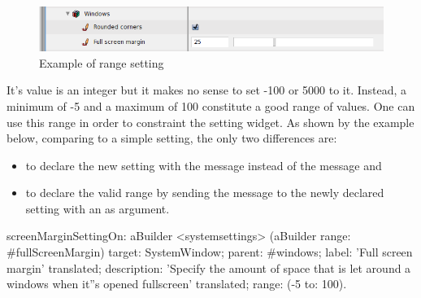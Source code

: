 \documentclass[a4paper,10pt,twoside]{book}
\begin{document}
\begin{figure}[tbh]
\begin{center}
\includegraphics[scale=0.38]{fullScreenMargin}
\caption{Example of range setting}
\end{center}
\end{figure}

It's value is an integer but it makes no sense to set -100 or 5000 to it. 
Instead, a minimum of -5 and a maximum of 100 constitute a good range of values. One can use this range in order to constraint the setting widget. As shown by the example below, comparing to a simple setting, the only two differences are:
\begin{itemize}
\item 
	to declare the new setting with the  message instead of the  message and
\item
	to declare the valid range by sending the  message to the newly declared setting with an  as argument.
\end{itemize}

\begin{code}{}
screenMarginSettingOn: aBuilder
	<systemsettings>
	(aBuilder range: #fullScreenMargin)
		target: SystemWindow;
		parent: #windows;
		label: 'Full screen margin' translated;
		description: 'Specify the amount of space that is let around a windows when it''s opened fullscreen' translated;
		range: (-5 to: 100).
\end{code}
\end{document}
